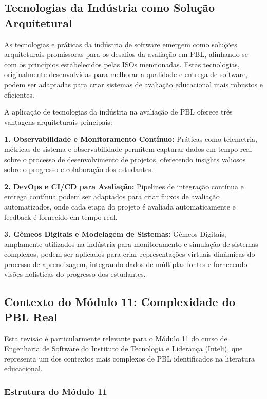 \documentclass[english, spanish, brazilian]{RBIEarticle} %
\begin{document}
\subsection{Tecnologias da Indústria como Solução Arquitetural}

As tecnologias e práticas da indústria de software emergem como soluções arquiteturais promissoras para os desafios da avaliação em PBL, alinhando-se com os princípios estabelecidos pelas ISOs mencionadas. Estas tecnologias, originalmente desenvolvidas para melhorar a qualidade e entrega de software, podem ser adaptadas para criar sistemas de avaliação educacional mais robustos e eficientes.

A aplicação de tecnologias da indústria na avaliação de PBL oferece três vantagens arquiteturais principais:

\textbf{1. Observabilidade e Monitoramento Contínuo:} Práticas como telemetria, métricas de sistema e observabilidade permitem capturar dados em tempo real sobre o processo de desenvolvimento de projetos, oferecendo insights valiosos sobre o progresso e colaboração dos estudantes.

\textbf{2. DevOps e CI/CD para Avaliação:} Pipelines de integração contínua e entrega contínua podem ser adaptados para criar fluxos de avaliação automatizados, onde cada etapa do projeto é avaliada automaticamente e feedback é fornecido em tempo real.

\textbf{3. Gêmeos Digitais e Modelagem de Sistemas:} Gêmeos Digitais, amplamente utilizados na indústria para monitoramento e simulação de sistemas complexos, podem ser aplicados para criar representações virtuais dinâmicas do processo de aprendizagem, integrando dados de múltiplas fontes e fornecendo visões holísticas do progresso dos estudantes.

\subsection{Contexto do Módulo 11: Complexidade do PBL Real}

Esta revisão é particularmente relevante para o Módulo 11 do curso de Engenharia de Software do Instituto de Tecnologia e Liderança (Inteli), que representa um dos contextos mais complexos de PBL identificados na literatura educacional.

\subsubsection{Estrutura do Módulo 11}
\end{document}
